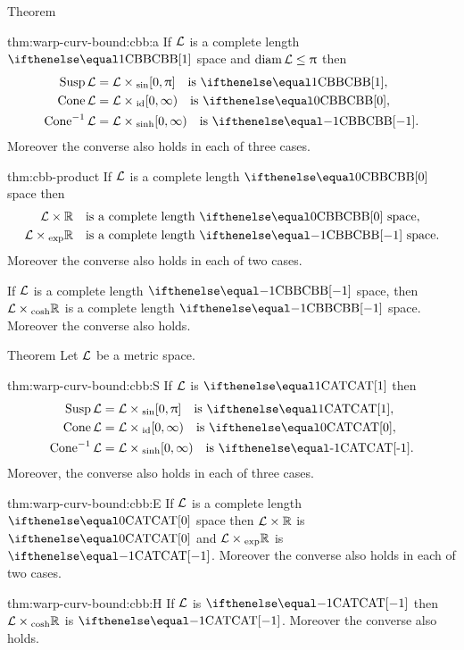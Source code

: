 \begin{thm}{Theorem}\label{thm:warp-curv-bound:cbb}
\begin{subthm}{thm:warp-curv-bound:cbb:a}
If $\mathcal{L}$ is a complete length $\Alex{1}$ space and $\diam\spc{L}\le\pi$
then 
\begin{align*}
\Susp\spc{L}&=\spc{L}\times_{\sin}[0,\pi]\quad\text{is  $\Alex1$},
\\
\Cone\spc{L}&=\spc{L}\times_{\id}[0,\infty)\quad\text{is  $\Alex0$},
\\
\Cone\mc{-1}\spc{L}&=\spc{L}\times_{\sinh}[0,\infty)\quad\text{is  $\Alex{-1}$}.
\end{align*}
Moreover the converse also holds in each of three cases.
\end{subthm}

\begin{subthm}{thm:cbb-product}
If $\mathcal{L}$ is a complete length $\Alex0$ space
then 
\begin{align*}
\spc{L}\times\RR&\quad\text{is a complete length $\Alex0$ space},
\\
\spc{L}\times_{\exp}\RR&\quad\text{is a complete length $\Alex{-1}$ space.}
\end{align*}
Moreover the converse also holds in each of two cases.
\end{subthm}

\begin{subthm}{}
If $\mathcal{L}$ is a complete length $\Alex{-1}$ space,
then $\spc{L}\times_{\cosh}\RR$ is a complete length $\Alex{-1}$ space.
Moreover the converse also holds.
\end{subthm}
\end{thm}


\begin{thm}{Theorem}\label{thm:warp-curv-bound:cat}
Let $\mathcal{L}$ be a metric space.
\begin{subthm}{thm:warp-curv-bound:cbb:S}
If $\mathcal{L}$ is $\CAT{1}$
then 
\begin{align*}
\Susp\spc{L}&=\spc{L}\times_{\sin}[0,\pi]\quad\text{is  \CAT{1}},
\\
\Cone\spc{L}&=\spc{L}\times_{\id}[0,\infty)\quad\text{is  \CAT{0}},
\\
\Cone\mc{-1}\spc{L}&=\spc{L}\times_{\sinh}[0,\infty)\quad\text{is  \CAT{-1}}.
\end{align*}
Moreover, the converse also holds in each of three cases.
\end{subthm}

\begin{subthm}{thm:warp-curv-bound:cbb:E}
If $\mathcal{L}$ is a complete length $\CAT0$ space
then 
$\spc{L}\times\RR$ is $\CAT0$ 
and 
$\spc{L}\times_{\exp}\RR$ is $\CAT{-1}$.
Moreover the converse also holds in each of two cases.
\end{subthm}

\begin{subthm}{thm:warp-curv-bound:cbb:H}
If $\mathcal{L}$ is $\CAT{-1}$
then 
$\spc{L}\times_{\cosh}\RR$
is $\CAT{-1}$.
Moreover the converse also holds.
\end{subthm}
\end{thm}

